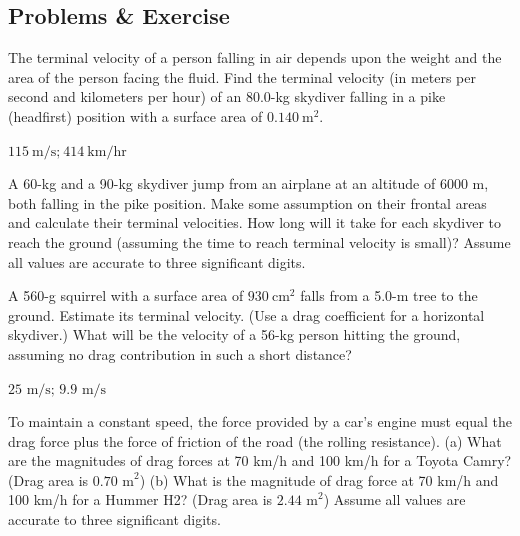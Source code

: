 \documentclass[
]{book}
\newenvironment{problems-exercises}{}{}
\begin{document}
\hypertarget{fs-id1165298548394}{}
\begin{problems-exercises}

\hypertarget{problems-exercise}{%
\subsection{Problems \& Exercise}\label{problems-exercise}}

\hypertarget{fs-id1165298861311}{}
\leavevmode\hypertarget{fs-id1165298992884}{}%
The terminal velocity of a person falling in air depends upon the weight
and the area of the person facing the fluid. Find the terminal velocity
(in meters per second and kilometers per hour) of an 80.0-kg skydiver
falling in a pike (headfirst) position with a surface area of
\({0\text{.}\text{140}\ \text{m}^{2}}{}\).

\leavevmode\hypertarget{eip-id1170075023622}{}%
\({\text{115}\ \text{m/s;}\ \text{414}\ \text{km/hr}}{}\)

\hypertarget{fs-id1165298948219}{}
\leavevmode\hypertarget{fs-id1165298671940}{}%
A 60-kg and a 90-kg skydiver jump from an airplane at an altitude of
6000 m, both falling in the pike position. Make some assumption on their
frontal areas and calculate their terminal velocities. How long will it
take for each skydiver to reach the ground (assuming the time to reach
terminal velocity is small)? Assume all values are accurate to three
significant digits.

\hypertarget{fs-id1165298835347}{}
\leavevmode\hypertarget{fs-id1165298642067}{}%
A 560-g squirrel with a surface area of \({\text{930}\ \text{cm}^{2}}{}\)
falls from a 5.0-m tree to the ground. Estimate its terminal velocity.
(Use a drag coefficient for a horizontal skydiver.) What will be the
velocity of a 56-kg person hitting the ground, assuming no drag
contribution in such a short distance?

\leavevmode\hypertarget{eip-id1170075018299}{}%
\(\text{25\ m/s;\ 9.9\ m/s}{}\)

\hypertarget{fs-id1165298803376}{}
\leavevmode\hypertarget{fs-id1165298609030}{}%
To maintain a constant speed, the force provided by a car's engine must
equal the drag force plus the force of friction of the road (the rolling
resistance). (a) What are the magnitudes of drag forces at 70 km/h and
100 km/h for a Toyota Camry? (Drag area is \(\text{0.70\ m}^{2}{}\)) (b)
What is the magnitude of drag force at 70 km/h and 100 km/h for a Hummer
H2? (Drag area is \({2\text{.}\text{44\ m}^{2}}{}\)) Assume all values are
accurate to three significant digits.


\end{problems-exercises}
\end{document}

